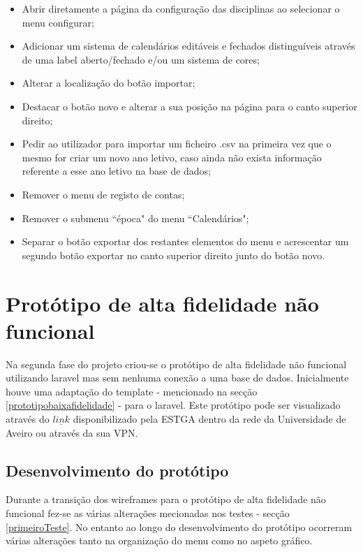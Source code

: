 \documentclass[11pt, twoside]{report}
\begin{document}
\begin{itemize}
	\item Abrir diretamente a página da configuração das disciplinas ao selecionar o menu configurar;
	\item Adicionar um sistema de calendários editáveis e fechados distinguíveis através de uma label aberto/fechado e/ou um sistema de cores;
	\item Alterar a localização do botão importar;
	\item Destacar o botão novo e alterar a sua posição na página para o canto superior direito;
	\item Pedir ao utilizador para importar um ficheiro .csv na primeira vez que o mesmo for criar um novo ano letivo, caso ainda não exista informação referente a esse ano letivo na base de dados;
	\item Remover o menu de registo de contas;
	\item Remover o submenu ``época" do menu ``Calendários";		
	\item Separar o botão exportar dos restantes elementos do menu e acrescentar um segundo botão exportar no canto superior direito junto do botão novo.

\end{itemize}

	\section{Protótipo de alta fidelidade não funcional}
	
	Na segunda fase do projeto criou-se o protótipo de alta fidelidade não funcional utilizando laravel mas sem nenhuma conexão a uma base de dados. Inicialmente houve uma adaptação do template - mencionado na secção \ref{prototipobaixafidelidade} - para o laravel. Este protótipo pode ser visualizado através do \href{http://estga-dev.clients.ua.pt/~ptdw-2021-gr4}{$\underline{link}$}  disponibilizado pela ESTGA dentro da rede da Universidade de Aveiro ou através da sua VPN.
	
	\subsection{Desenvolvimento do protótipo}

	Durante a transição dos wireframes para o protótipo de alta fidelidade não funcional fez-se as várias alterações mecionadas nos testes - secção \ref{primeiroTeste}. No entanto ao longo do desenvolvimento do protótipo ocorreram várias alterações tanto na organização do menu como no aspeto gráfico.
	
\end{document}
